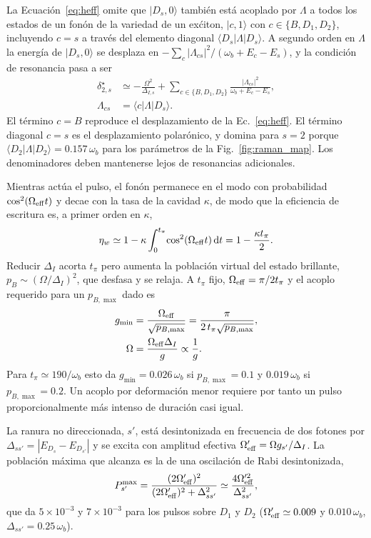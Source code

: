 \documentclass[aps,pra,twocolumn,groupedaddress,amsmath,amssymb,floatfix]{revtex4-2}
\newcommand{\ket}[1]{\lvert #1\rangle}
\newcommand{\bra}[1]{\langle #1\rvert}
\newcommand{\wb}{\omega_b}
\begin{document}
La Ecuaci\'on~\eqref{eq:heff} omite que $\ket{D_s,0}$ tambi\'en est\'a acoplado por $\Lambda$ a todos los estados de un fon\'on de la variedad de un ex\'citon, $\ket{c,1}$ con $c\in\{B,D_1,D_2\}$, incluyendo $c=s$ a trav\'es del elemento diagonal $\bra{D_s}\Lambda\ket{D_s}$. A segundo orden en $\Lambda$ la energ\'ia de $\ket{D_s,0}$ se desplaza en $-\sum_c|\Lambda_{cs}|^2/(\wb+E_c-E_s)$, y la condici\'on de resonancia pasa a ser
\begin{align}
\delta_{2,s}^{\star}&\simeq-\frac{\Omega^2}{\Delta_{I,s}}+\sum_{c\in\{B,D_1,D_2\}}\frac{|\Lambda_{cs}|^2}{\wb+E_c-E_s},\nonumber\\
\Lambda_{cs}&=\bra c\Lambda\ket{D_s}.\label{eq:stark}
\end{align}
El t\'ermino $c=B$ reproduce el desplazamiento de la Ec.~\eqref{eq:heff}. El t\'ermino diagonal $c=s$ es el desplazamiento polar\'onico, y domina para $s=2$ porque $\bra{D_2}\Lambda\ket{D_2}=0.157\,\wb$ para los par\'ametros de la Fig.~\ref{fig:raman_map}. Los denominadores deben mantenerse lejos de resonancias adicionales.

Mientras act\'ua el pulso, el fon\'on permanece en el modo con probabilidad $\cos^2(\Omega_{\rm eff}t)$ y decae con la tasa de la cavidad $\kappa$, de modo que la eficiencia de escritura es, a primer orden en $\kappa$,
\begin{equation}
\eta_w\simeq1-\kappa\int_0^{t_\pi}\!\cos^2(\Omega_{\rm eff}t)\,\mathrm dt=1-\frac{\kappa t_\pi}{2}.\label{eq:etaw}
\end{equation}
Reducir $\Delta_I$ acorta $t_\pi$ pero aumenta la poblaci\'on virtual del estado brillante, $p_B\sim(\Omega/\Delta_I)^2$, que desfasa y se relaja. A $t_\pi$ fijo, $\Omega_{\rm eff}=\pi/2t_\pi$ y el acoplo requerido para un $p_{B,\max}$ dado es
\begin{align}
g_{\min}&=\frac{\Omega_{\rm eff}}{\sqrt{p_{B,\max}}}=\frac{\pi}{2\,t_\pi\sqrt{p_{B,\max}}},\nonumber\\
\Omega&=\frac{\Omega_{\rm eff}\Delta_I}{g}\propto\frac1g.\label{eq:gmin}
\end{align}
Para $t_\pi\simeq190/\wb$ esto da $g_{\min}=0.026\,\wb$ si $p_{B,\max}=0.1$ y $0.019\,\wb$ si $p_{B,\max}=0.2$. Un acoplo por deformaci\'on menor requiere por tanto un pulso proporcionalmente m\'as intenso de duraci\'on casi igual.

La ranura no direccionada, $s'$, est\'a desintonizada en frecuencia de dos fotones por $\Delta_{ss'}=|E_{D_s}-E_{D_{s'}}|$ y se excita con amplitud efectiva $\Omega_{\rm eff}'=\Omega g_{s'}/\Delta_I$. La poblaci\'on m\'axima que alcanza es la de una oscilaci\'on de Rabi desintonizada,
\begin{equation}
P_{s'}^{\max}=\frac{(2\Omega_{\rm eff}')^2}{(2\Omega_{\rm eff}')^2+\Delta_{ss'}^2}\simeq\frac{4\Omega_{\rm eff}'^2}{\Delta_{ss'}^2},\label{eq:leak}
\end{equation}
que da $5\times10^{-3}$ y $7\times10^{-3}$ para los pulsos sobre $D_1$ y $D_2$ ($\Omega_{\rm eff}'\simeq0.009$ y $0.010\,\wb$, $\Delta_{ss'}=0.25\,\wb$).
\end{document}
